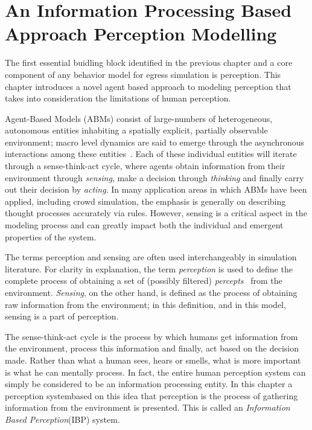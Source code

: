 
\chapter{An Information Processing Based Approach Perception Modelling}
\label{chapter:IBP}

The first essential buidling block identified in the previous chapter and a core component of any behavior model for egress simulation is perception. This chapter introduces a novel agent based approach to modeling perception that takes into consideration the limitations of human perception.

Agent-Based Models (ABMs) consist of large-numbers of heterogeneous, autonomous entities inhabiting a spatially explicit, partially observable environment; macro level dynamics are said to emerge through the asynchronous interactions among these entities~\cite{Bonabeau:2002um,Epstein:1999vn}. Each of these individual entities will iterate through a sense-think-act cycle, where agents obtain information from their environment through {\em sensing}, make a decision through {\em thinking} and finally carry out their decision by {\em acting}. In many application areas in which ABMs have been applied, including crowd simulation, the emphasis is generally on describing thought processes accurately via rules. However, sensing is a critical aspect in the modeling process and can greatly impact both the individual and emergent properties of the system.

The terms perception and sensing are often used interchangeably in simulation literature. For clarity in explanation, the term {\em perception} is used to define the complete process of obtaining a set of (possibly filtered) \emph{percepts}~\cite{Russel:1995vi} from the environment. {\em Sensing}, on the other hand, is defined as the process of obtaining raw information from the environment; in this definition, and in this model, sensing is a part of perception.

The sense-think-act cycle is the process by which humans get information from the environment, process this information and finally, act based on the decision made. Rather than what a human sees, hears or smells, what is more important is what he can mentally process. In fact, the entire human perception system can simply be considered to be an information processing entity. In this chapter a perception systembased on this idea that perception is the process of gathering information from the environment is presented. This is called an \emph{Information Based Perception}(IBP) system.

